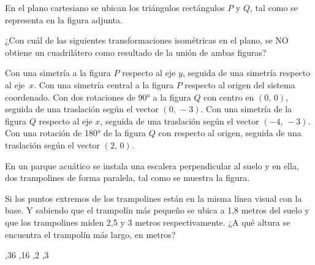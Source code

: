 \documentclass[sin nombre]{srs}
\begin{document}
\begin{preguntas}[after-item-skip=1cm]
\pregunta En el plano cartesiano se ubican los triángulos rectángulos $P$ y $Q$, tal como se representa en la figura adjunta.
\begin{centrado}
\end{centrado}
¿Con cuál de las siguientes transformaciones isométricas en el plano,
se NO obtiene un cuadrilátero como resultado de la unión de ambas figuras?
\begin{vertical}
\alternativa Con una simetría a la figura $P$ respecto al eje $y$, seguida de una simetría respecto al \mbox{eje $x$}.
\alternativa Con una simetría central a la figura $P$ respecto al origen del sistema coordenado.
\alternativa Con dos rotaciones de 90° a la figura $Q$ con centro en $(0,\,0)$, seguida de una traslación según el vector $(0,\,-3)$.
\alternativa Con una simetría de la figura $Q$ respecto al eje $x$, seguida de una traslación según el vector $(-4,\,-3)$.
\alternativa Con una rotación de 180° de la figura $Q$ con respecto al origen, seguida de una traslación según el vector $(2,\,0)$.
\end{vertical}

\pregunta En un parque acuático se instala una escalera perpendicular al suelo y en ella, dos trampolines de forma paralela, tal como se muestra la figura.
\begin{centrado}
\end{centrado}
Si los puntos extremos de los trampolines están en la misma línea visual con la base. Y sabiendo que el trampolín más pequeño se ubica a 1,8 metros del suelo y que los trampolines miden 2,5 y 3 metros respectivamente. ¿A qué altura se encuentra el trampolín más largo, en metros?
\begin{vertical}
,36
,16
,2
,3
\end{vertical}


\end{preguntas}
\end{document}
